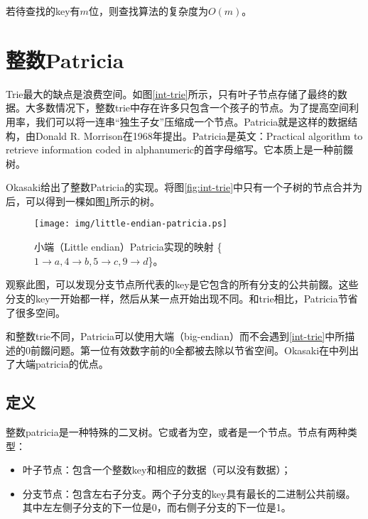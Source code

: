\documentclass[UTF8]{article}
\begin{document}
若待查找的key有$m$位，则查找算法的复杂度为$O(m)$。

\section{整数Patricia}
\label{int-patricia}

Trie最大的缺点是浪费空间。如图\ref{int-trie}所示，只有叶子节点存储了最终的数据。大多数情况下，整数trie中存在许多只包含一个孩子的节点。为了提高空间利用率，我们可以将一连串“独生子女”压缩成一个节点。Patricia就是这样的数据结构，由Donald R. Morrison在1968年提出。Patricia是英文：Practical algorithm to retrieve information coded in alphanumeric的首字母缩写\cite{patricia-morrison}。它本质上是一种前餟树。

Okasaki给出了整数Patricia的实现\cite{okasaki-int-map}。将图\ref{fig:int-trie}中只有一个子树的节点合并为后，可以得到一棵如图\ref{fig:little-endian-patricia}所示的树。

\begin{figure}[htbp]
  \centering
  \texttt{[image: img/little-endian-patricia.ps]}
  \caption{小端（Little endian）Patricia实现的映射
     \{$ 1 \rightarrow a, 4 \rightarrow b, 5 \rightarrow c, 9 \rightarrow d$\}。}
  \label{fig:little-endian-patricia}
\end{figure}

观察此图，可以发现分支节点所代表的key是它包含的所有分支的公共前餟。这些分支的key一开始都一样，然后从某一点开始出现不同。和trie相比，Patricia节省了很多空间。

和整数trie不同，Patricia可以使用大端（big-endian）而不会遇到\ref{int-trie}中所描述的0前餟问题。第一位有效数字前的0全都被去除以节省空间。Okasaki在\cite{okasaki-int-map}中列出了大端patricia的优点。

\subsection{定义}

整数patricia是一种特殊的二叉树。它或者为空，或者是一个节点。节点有两种类型：

\begin{itemize}
\item 叶子节点：包含一个整数key和相应的数据（可以没有数据）；
\item 分支节点：包含左右子分支。两个子分支的key具有最长的二进制公共前缀。其中左左侧子分支的下一位是0，而右侧子分支的下一位是1。
\end{itemize}
\end{document}
